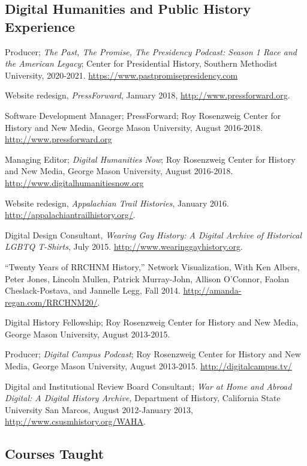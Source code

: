 \documentclass[11pt]{article}
\begin{document}
\subsection{Digital Humanities and Public History Experience}

Producer; \emph{The Past, The Promise, The Presidency Podcast: Season 1 Race and the American Legacy}; Center for Presidential History, Southern Methodist University, 2020-2021. \url{https://www.pastpromisepresidency.com}

Website redesign, \emph{PressForward}, January 2018, \url{http://www.pressforward.org}.

Software Development Manager; PressForward; Roy Rosenzweig Center for History and New Media, George Mason University, August 2016-2018. \url{http://www.pressforward.org}

Managing Editor; \emph{Digital Humanities Now}; Roy Rosenzweig Center for History and New Media, George Mason University, August 2016-2018. \url{http://www.digitalhumanitiesnow.org}

Website redesign, \emph{Appalachian Trail Histories}, January 2016. \url{http://appalachiantrailhistory.org/}.

Digital Design Consultant, \emph{Wearing Gay History: A Digital Archive of Historical LGBTQ T-Shirts}, July 2015. \url{http://www.wearinggayhistory.org}.

``Twenty Years of RRCHNM History,'' Network Visualization, With Ken Albers, Peter Jones, Lincoln Mullen, Patrick Murray-John, Allison O’Connor, Faolan Cheslack-Postava, and Jannelle Legg, Fall 2014. \url{http://amanda-regan.com/RRCHNM20/}.

Digital History Fellowship; Roy Rosenzweig Center for History and New Media, George Mason University, August 2013-2015.

Producer; \emph{Digital Campus Podcast}; Roy Rosenzweig Center for History and New Media, George Mason University, August 2013-2015. \url{http://digitalcampus.tv/}

Digital and Institutional Review Board Consultant; \emph{War at Home and Abroad Digital: A Digital History Archive,} Department of History, California State University San Marcos, August 2012-January 2013, \url{http://www.csusmhistory.org/WAHA}.


\subsection{Courses Taught}
\end{document}
